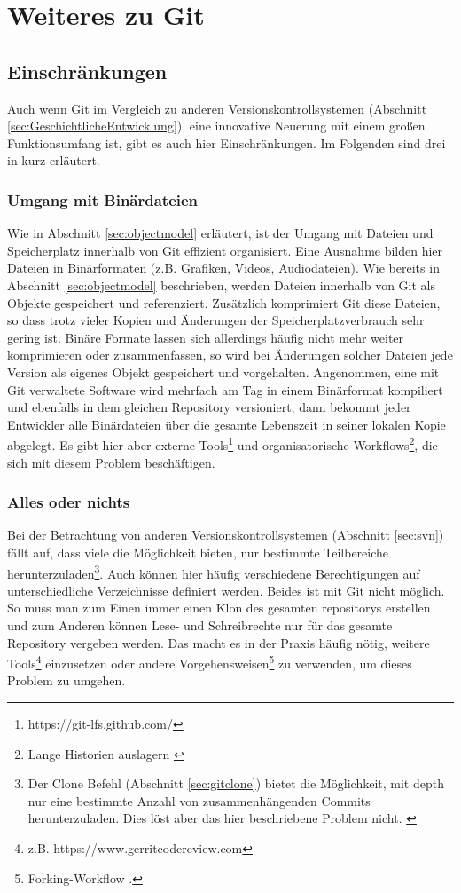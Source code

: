 \chapter{Weiteres zu Git}\label{cha:lookout}
\section{Einschränkungen}\label{sec:problems}
Auch wenn Git im Vergleich zu anderen Versionskontrollsystemen (Abschnitt
\ref{sec:GeschichtlicheEntwicklung}), eine innovative Neuerung mit einem großen
Funktionsumfang ist, gibt es auch hier Einschränkungen. Im Folgenden sind drei
in kurz erläutert.

\subsection{Umgang mit Binärdateien}\label{sec:binaries}
Wie in Abschnitt \ref{sec:objectmodel} erläutert, ist der Umgang mit
Dateien und Speicherplatz innerhalb von Git effizient organisiert. Eine
Ausnahme bilden hier Dateien in Binärformaten (z.B.  Grafiken, Videos,
Audiodateien). Wie bereits in Abschnitt \ref{sec:objectmodel} beschrieben,
werden Dateien innerhalb von Git als Objekte gespeichert und referenziert.
Zusätzlich komprimiert Git diese Dateien, so dass trotz vieler Kopien und
Änderungen der Speicherplatzverbrauch sehr gering ist. Binäre Formate lassen
sich allerdings häufig nicht mehr weiter komprimieren oder zusammenfassen, so
wird bei Änderungen solcher Dateien jede Version als eigenes Objekt
gespeichert und vorgehalten. Angenommen, eine mit Git verwaltete Software wird
mehrfach am Tag in einem Binärformat kompiliert und ebenfalls in dem gleichen
Repository versioniert, dann bekommt jeder Entwickler alle Binärdateien über
die gesamte Lebenszeit in seiner lokalen Kopie abgelegt.  Es gibt hier aber
externe Tools\footnote{https://git-lfs.github.com/} und organisatorische
Workflows\footnote{Lange Historien auslagern \cite[S.~235-244]{gitwf}}, die sich
mit diesem Problem beschäftigen. \cite[S.~300]{gitwf}

\subsection{Alles oder nichts}
Bei der Betrachtung von anderen Versionskontrollsystemen (Abschnitt
\ref{sec:svn}) fällt auf, dass viele die Möglichkeit bieten, nur bestimmte
Teilbereiche herunterzuladen\footnote{Der Clone Befehl (Abschnitt
\ref{sec:gitclone}) bietet die Möglichkeit, mit \-{}\-{}depth nur eine
bestimmte Anzahl von zusammenhängenden Commits herunterzuladen. Dies löst aber das
hier beschriebene Problem nicht. \cite[S.~244]{gitwf}}. Auch können hier
häufig verschiedene Berechtigungen auf unterschiedliche Verzeichnisse definiert
werden.  Beides ist mit Git nicht möglich. So muss man zum Einen immer einen
Klon des gesamten \glspl{repository} erstellen und zum Anderen können Lese- und
Schreibrechte nur für das gesamte Repository vergeben werden. Das macht es in
der Praxis häufig nötig, weitere Tools\footnote{z.B.
https://www.gerritcodereview.com} einzusetzen oder andere
Vorgehensweisen\footnote{Forking-Workflow \cite[S.~163-173]{gitwf}.} zu
verwenden, um dieses Problem zu umgehen. \cite[300-302]{gitwf}

